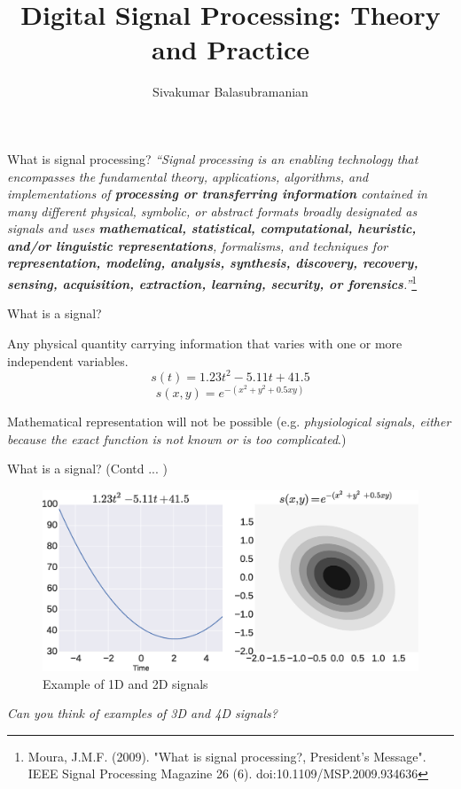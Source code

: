 \documentclass{beamer}
\title{Digital Signal Processing: Theory and Practice}
\subtitle{}
\author{Sivakumar Balasubramanian}
\institute[Christian Medical College] %
{
  \inst{}%
  Department of Bioengineering\\
  Christian Medical College, Bagayam\\
  Vellore 632002
}
\date{}
\begin{document}
\begin{frame}
  \titlepage
\end{frame}

\begin{frame}{What is signal processing?}
\textit{
``Signal processing is an enabling technology that encompasses the fundamental theory, applications, algorithms, and implementations of \textbf{processing or transferring information} contained in many different physical, symbolic, or abstract formats broadly designated as signals and uses \textbf{mathematical, statistical, computational, heuristic, and/or linguistic representations}, formalisms, and techniques for \textbf{representation, modeling, analysis, synthesis, discovery, recovery, sensing, acquisition, extraction, learning, security, or forensics}.''}\footnote{\tiny{Moura, J.M.F. (2009). "What is signal processing?, President’s Message". IEEE Signal Processing Magazine 26 (6). doi:10.1109/MSP.2009.934636}}
\end{frame}

\begin{frame}{What is a signal?}

Any physical quantity carrying information that varies with one or more independent variables.
$$ s\left(t\right) = 1.23t^2 - 5.11t +41.5 $$
$$ s\left(x,y\right) = e^{-(x^2 + y^2 + 0.5xy)} $$

Mathematical representation will not be possible (e.g. \textit{physiological signals,  either because the exact function is not known or is too complicated}.)
\end{frame}

\begin{frame}{What is a signal? (Contd ... )}

\begin{figure}
\includegraphics[width=\textwidth]{img/signals.eps}
\caption{Example of 1D and 2D signals}
\end{figure}

\textit{Can you think of examples of 3D and 4D signals?}
\end{frame}
\end{document}
